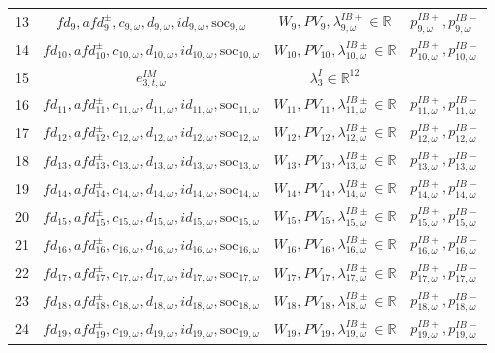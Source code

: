 \documentclass{article}
\newcommand{\R}{\mathbb{R}}
\newcommand{\soc}{\text{soc}}
\begin{document}
\begin{table}
\begin{tabular}{c c c c}
	13 & $fd_9, afd^{\pm}_9, c_{9, \omega}, d_{9, \omega}, id_{9, \omega}, \soc_{9, \omega}$ & $W_9, PV_9, \lambda^{IB+}_{9, \omega} \in \R$ & $p^{IB+}_{9, \omega}, p^{IB-}_{9, \omega}$\\
	14 & $fd_{10}, afd^{\pm}_{10}, c_{10, \omega}, d_{10, \omega}, id_{10, \omega}, \soc_{10, \omega}$ & $W_{10}, PV_{10}, \lambda^{IB\pm}_{10, \omega} \in \R$ & $p^{IB+}_{10, \omega}, p^{IB-}_{10, \omega}$ \\
    15 & $e^{IM}_{3, t, \omega}$ & $\lambda^I_3 \in \R^{12}$ &  \\
	16 & $fd_{11}, afd^{\pm}_{11}, c_{11, \omega}, d_{11, \omega}, id_{11, \omega}, \soc_{11, \omega}$ & $W_{11}, PV_{11}, \lambda^{IB\pm}_{11, \omega} \in \R$ & $p^{IB+}_{11, \omega}, p^{IB-}_{11, \omega}$ \\
	17 & $fd_{12}, afd^{\pm}_{12}, c_{12, \omega}, d_{12, \omega}, id_{12, \omega}, \soc_{12, \omega}$ & $W_{12}, PV_{12}, \lambda^{IB\pm}_{12, \omega} \in \R$ & $p^{IB+}_{12, \omega}, p^{IB-}_{12, \omega}$ \\
	18 & $fd_{13}, afd^{\pm}_{13}, c_{13, \omega}, d_{13, \omega}, id_{13, \omega}, \soc_{13, \omega}$ & $W_{13}, PV_{13}, \lambda^{IB\pm}_{13, \omega} \in \R$ & $p^{IB+}_{13, \omega}, p^{IB-}_{13, \omega}$ \\
	19 & $fd_{14}, afd^{\pm}_{14}, c_{14, \omega}, d_{14, \omega}, id_{14, \omega}, \soc_{14, \omega}$ & $W_{14}, PV_{14}, \lambda^{IB\pm}_{14, \omega} \in \R$ & $p^{IB+}_{14, \omega}, p^{IB-}_{14, \omega}$ \\
	20 & $fd_{15}, afd^{\pm}_{15}, c_{15, \omega}, d_{15, \omega}, id_{15, \omega}, \soc_{15, \omega}$ & $W_{15}, PV_{15}, \lambda^{IB\pm}_{15, \omega} \in \R$ & $p^{IB+}_{15, \omega}, p^{IB-}_{15, \omega}$ \\
	21 & $fd_{16}, afd^{\pm}_{16}, c_{16, \omega}, d_{16, \omega}, id_{16, \omega}, \soc_{16, \omega}$ & $W_{16}, PV_{16}, \lambda^{IB\pm}_{16, \omega} \in \R$ & $p^{IB+}_{16, \omega}, p^{IB-}_{16, \omega}$ \\
	22 & $fd_{17}, afd^{\pm}_{17}, c_{17, \omega}, d_{17, \omega}, id_{17, \omega}, \soc_{17, \omega}$ & $W_{17}, PV_{17}, \lambda^{IB\pm}_{17, \omega} \in \R$ & $p^{IB+}_{17, \omega}, p^{IB-}_{17, \omega}$ \\
	23 & $fd_{18}, afd^{\pm}_{18}, c_{18, \omega}, d_{18, \omega}, id_{18, \omega}, \soc_{18, \omega}$ & $W_{18}, PV_{18}, \lambda^{IB\pm}_{18, \omega} \in \R$ &  $p^{IB+}_{18, \omega}, p^{IB-}_{18, \omega}$ \\
	24 & $fd_{19}, afd^{\pm}_{19}, c_{19, \omega}, d_{19, \omega}, id_{19, \omega}, \soc_{19, \omega}$ & $W_{19}, PV_{19}, \lambda^{IB\pm}_{19, \omega} \in \R$ & $p^{IB+}_{19, \omega}, p^{IB-}_{19, \omega}$ \\

\end{tabular}
\end{table}
\end{document}
